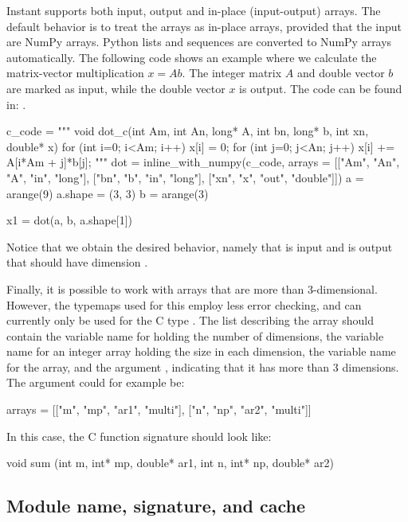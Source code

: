 Instant supports both input, output and in-place (input-output) arrays.
The default
behavior is to treat the arrays as in-place arrays, provided that the
input are NumPy arrays. Python lists and sequences are converted to
NumPy arrays automatically.  The following code shows an example where
we calculate the matrix-vector multiplication $x = Ab$. The integer
matrix $A$ and double vector $b$ are marked as input, while the double
vector $x$ is output. The code can be found in: .
\begin{python}
c_code = """
void dot_c(int Am, int An, long* A, int bn, long* b, int xn, double* x)
{
    for (int i=0; i<Am; i++)
    {
        x[i] = 0;
        for (int j=0; j<An; j++)
        {
            x[i] += A[i*Am + j]*b[j];
        }
    }
}
"""
dot = inline_with_numpy(c_code,
                          arrays = [["Am", "An", "A", "in", "long"],
                                    ["bn", "b", "in", "long"],
                                    ["xn", "x", "out", "double"]])
a = arange(9)
a.shape = (3, 3)
b = arange(3)

x1 = dot(a, b, a.shape[1])
\end{python}
Notice that we obtain the desired behavior, namely that  is
input and  is output that should have dimension .

Finally, it is possible to work with arrays that are more than
3-dimensional.  However, the typemaps used for this employ less error
checking, and can currently only be used for the C
type . The list describing the array should contain the
variable name for holding the number of dimensions, the variable name
for an integer array holding the size in each dimension, the variable
name for the array, and the argument , indicating that it
has more than 3 dimensions. The  argument could for
example be:
\begin{python}
arrays = [["m", "mp", "ar1", "multi"],
          ["n", "np", "ar2", "multi"]]
\end{python}
In this case, the C function signature should look like:
\begin{c++}
void sum (int m, int* mp, double* ar1, int n,
          int* np, double* ar2)
\end{c++}

\subsection{Module name, signature, and cache}\label{wilbers:sec:msc}

